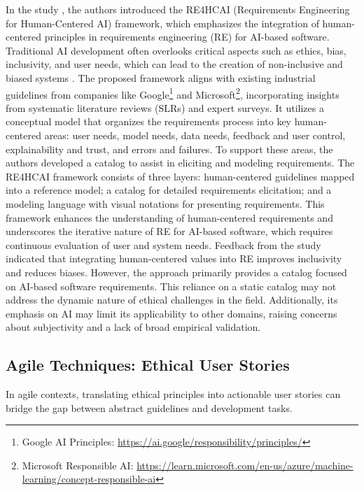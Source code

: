 In the study \cite{ahmad2023requirements}, the authors introduced the RE4HCAI (Requirements Engineering for Human-Centered AI) framework, which emphasizes the integration of human-centered principles in requirements 
engineering (RE) for AI-based software. Traditional AI development often overlooks critical aspects such as ethics, bias, inclusivity, and user needs, which can lead to the creation of non-inclusive and biased systems 
\cite{buolamwini2018gender}. 
The proposed framework aligns with existing industrial guidelines from companies like Google\footnote{Google AI Principles: \url{https://ai.google/responsibility/principles/}} and Microsoft\footnote{Microsoft Responsible AI: \url{https://learn.microsoft.com/en-us/azure/machine-learning/concept-responsible-ai}}, 
incorporating insights from systematic literature reviews (SLRs) and expert surveys. It utilizes a conceptual model that organizes the requirements process into key human-centered areas: user needs, 
model needs, data needs, feedback and user control, explainability and trust, and errors and failures. To support these areas, the authors developed a catalog to assist in eliciting and modeling 
requirements. The RE4HCAI framework consists of three layers: human-centered guidelines mapped into a reference model; a catalog for detailed requirements elicitation; and a modeling language with 
visual notations for presenting requirements. This framework enhances the understanding of human-centered requirements and underscores the iterative nature of RE for AI-based software, which requires 
continuous evaluation of user and system needs. Feedback from the study indicated that integrating human-centered values into RE improves inclusivity and reduces biases. However, the approach primarily 
provides a catalog focused on AI-based software requirements. This reliance on a static catalog may not address the dynamic nature of ethical challenges in the field. Additionally, its emphasis on AI 
may limit its applicability to other domains, raising concerns about subjectivity and a lack of broad empirical validation.


\subsection{Agile Techniques: Ethical User Stories}
In agile contexts, translating ethical principles into actionable user stories can bridge the gap between abstract guidelines and development tasks.


